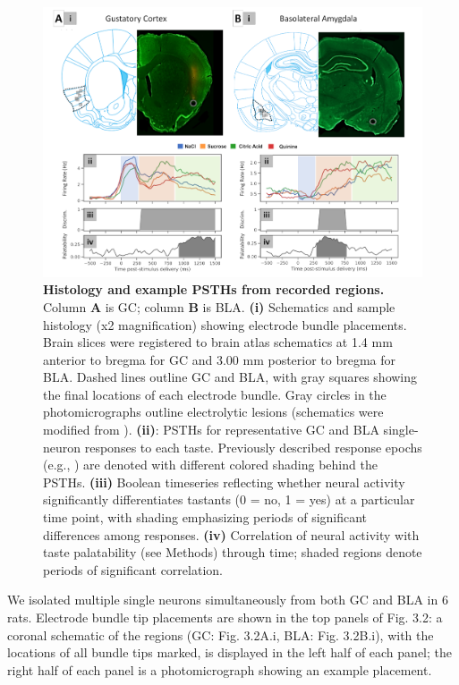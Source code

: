 \begin{refsection}
\begin{figure}
\includegraphics[width=\linewidth]{mahmood_22_figures/fig2-0.png}
\caption{\textbf{Histology and example PSTHs from recorded regions.} Column \textbf{A} is GC; column \textbf{B} is BLA. \textbf{(i)} Schematics and sample histology (x2 magnification) showing electrode bundle placements. Brain slices were registered to brain atlas schematics at 1.4 mm anterior to bregma for GC and 3.00 mm posterior to bregma for BLA. Dashed lines outline GC and BLA, with gray squares showing the final locations of each electrode bundle. Gray circles in the photomicrographs outline electrolytic lesions (schematics were modified from \cite{paxinos2007a}).  \textbf{(ii)}: PSTHs for representative GC and BLA single-neuron responses to each taste. Previously described response epochs (e.g., \cite{katz2001a}) are denoted with different colored shading behind the PSTHs. \textbf{(iii)}  Boolean timeseries reflecting whether neural activity significantly differentiates tastants (0 = no, 1 = yes) at a particular time point, with shading emphasizing periods of significant differences among responses. \textbf{(iv)} Correlation of neural activity with taste palatability (see Methods) through time; shaded regions denote periods of significant correlation.}
\label{fig:wrapfig}
\end{figure}

We isolated multiple single neurons simultaneously from both GC and BLA in 6 rats. Electrode bundle tip placements are shown in the top panels of Fig. 3.2: a coronal schematic of the regions (GC: Fig. 3.2A.i, BLA: Fig. 3.2B.i), with the locations of all bundle tips marked, is displayed in the left half of each panel; the right half of each panel is a photomicrograph showing an example placement. 


\end{refsection}
